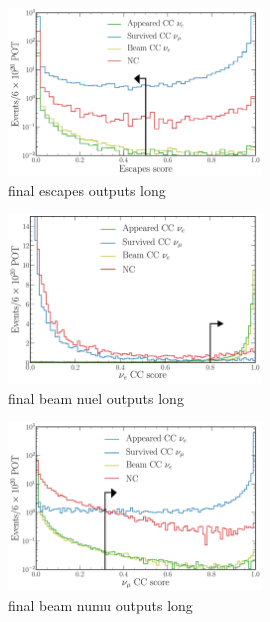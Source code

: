 \begin{figure} %
    \includegraphics[width=0.6\textwidth]{diagrams/6-cvn/chipsnet/final_escapes_outputs.pdf}
    \caption[final escapes outputs short]
    {final escapes outputs long}
    \label{fig:final_escapes_outputs}
\end{figure}

\begin{figure} %
    \includegraphics[width=0.6\textwidth]{diagrams/6-cvn/chipsnet/final_beam_nuel_outputs.pdf}
    \caption[final beam nuel outputs short]
    {final beam nuel outputs long}
    \label{fig:final_beam_nuel_outputs}
\end{figure}

\begin{figure} %
    \includegraphics[width=0.6\textwidth]{diagrams/6-cvn/chipsnet/final_beam_numu_outputs.pdf}
    \caption[final beam numu outputs short]
    {final beam numu outputs long}
    \label{fig:final_beam_numu_outputs}
\end{figure}

